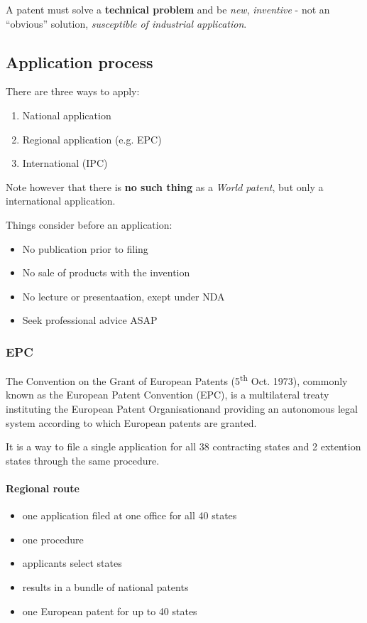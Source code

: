 \documentclass[12pt]{article} %
\begin{document}
A patent must solve a \textbf{technical problem} and be \textit{new}, \textit{inventive} - not an ``obvious'' solution, \textit{susceptible of industrial application}.

\subsection{Application process}

There are three ways to apply:
\begin{enumerate}
    \item National application
    \item Regional application (e.g. EPC)
    \item International (IPC)
\end{enumerate}

Note however that there is \textbf{no such thing} as a \textit{World patent}, but only a international application.

Things consider before an application:

\begin{itemize}
    \item No publication prior to filing
    \item No sale of products with the invention
    \item No lecture or presentaation, exept under NDA
    \item Seek professional advice ASAP
\end{itemize}

\subsubsection{EPC}

The Convention on the Grant of European Patents (5\textsuperscript{th} Oct. 1973), commonly known as the European Patent Convention (EPC), is a multilateral treaty instituting the European Patent Organisationand providing an autonomous legal system according to which European patents are granted.

It is a way to file a single application for all 38 contracting states and 2 extention states through the same procedure.

\paragraph{Regional route}

\begin{itemize}
    \item one application filed at one office for all 40 states
    \item one procedure
    \item applicants select states
    \item results in a bundle of national patents
    \item one European patent for up to 40 states
\end{itemize}
\end{document}

